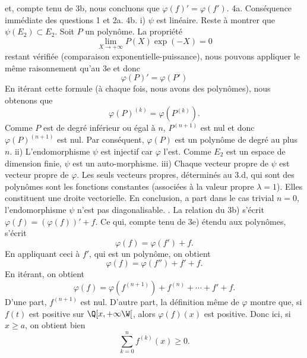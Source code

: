 et, compte tenu de 3b, nous concluons que $\varphi (f)'=\varphi (f')$.
\medskip
\noindent
4a. Cons\'equence imm\'ediate des questions 1 et 2a.
\medskip
\noindent
4b.
i)  $\psi$ est lin\'eaire. Reste \`a montrer que $\psi(E_{2})\subset E_{2}$. \pn
Soit $P$ un polyn\^ome. La propri\'et\'e 
$$
\lim_{X\to+\infty}P(X)\exp(-X)=0
$$ 
restant v\'erifi\'ee (comparaison exponentielle-puissance), nous pouvons appliquer le m\^eme raisonnement qu'au 3e et donc
$$
\varphi (P)'=\varphi (P')
$$
En it\'erant cette formule (\`a chaque fois, nous avons des polyn\^omes), nous obtenons que
$$
\varphi (P)^{(k)}=\varphi(P^{(k)}).
$$
Comme $P$ est de degr\'e inf\'erieur ou \'egal \`a $n$, $P^{(n+1)}$ est nul et donc $\varphi(P)^{(n+1)}$ est nul. Par cons\'equent, 
$\varphi(P)$ est un polyn\^ome de degr\'e au plus $n$.
\medskip
\noindent ii) L'endomorphisme $\psi$  est injectif car $\varphi$ l'est. Comme $E_{2}$ est un espace de dimension finie,  $\psi$ est un auto-morphisme. 
\medskip
\noindent
iii) Chaque vecteur propre de $\psi $ est vecteur propre de $\varphi $.
Les seuls vecteurs propres, d\'etermin\'es au 3.d, qui sont des polyn\^omes sont les fonctions constantes (associ\'ees \`a la valeur propre $\lambda =1$). Elles constituent une droite vectorielle. \pn
En conclusion, a part dans le cas trivial $n=0$, l'endomorphisme $\psi $ n'est pas diagonalisable.
\medskip
{}. La relation du 3b) s'\'ecrit $\varphi (f)=(\varphi (f))'+f$. Ce qui, compte tenu de 3e) \'etendu aux polyn\^omes, s'\'ecrit
$$
\varphi (f)=\varphi (f')+f.
$$
En appliquant ceci \`a $f'$, qui est un polyn\^ome, on obtient
$$
\varphi (f)=\varphi (f'')+f'+f.
$$
En it\'erant, on obtient
$$
\varphi(f)=\varphi(f^{(n+1)})+f^{(n)}+\cdots+f'+f.
$$
D'une part, $f^{(n+1)}$ est nul. D'autre part, la d\'efinition m\^eme de $\varphi $ montre que, si $f(t)$ est positive sur $
\Q[x,+\infty\W[$, alors $\varphi (f)(x)$ est positive. Donc ici, si $x\ge a$, on obtient bien
$$
\sum_{k=0}^{n} f^{(k)}(x)\ge 0.
$$
\bye